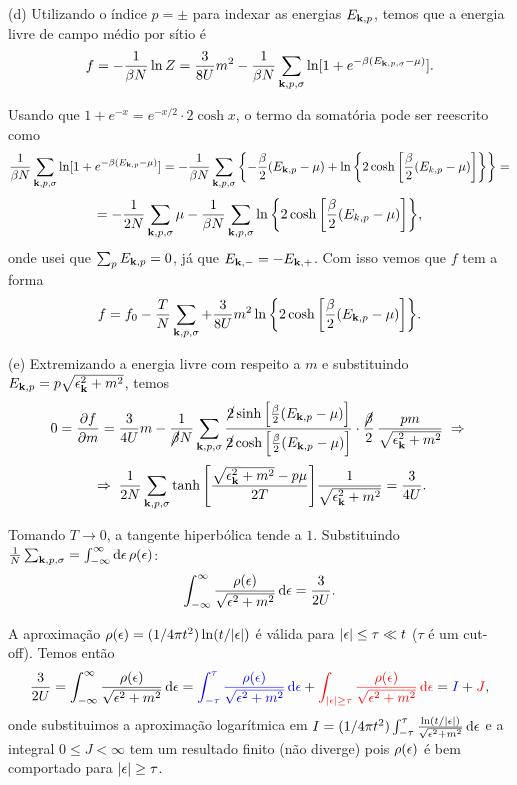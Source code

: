\documentclass[a4paper,10pt]{article}
\begin{document}
\pagebreak

(d) Utilizando o índice $p = \pm$ para indexar as energias $E_{\vb{k},p}$, temos que a energia livre de campo médio por sítio é
$$
f = - \frac{1}{\beta N} \ln Z = \frac{3}{8U}m^2 -
\frac{1}{\beta N} \sum_{\vb{k}, p, \sigma} \ln[ 1 + e^{-\beta (E_{\vb{k},p,\sigma} - \mu)} ].
$$

Usando que $1 + e^{-x} = e^{-x/2} \cdot 2 \cosh x$, o termo da somatória pode ser reescrito como
$$
\frac{1}{\beta N} \sum_{\vb{k}, p, \sigma} \ln[ 1 + e^{-\beta (E_{\vb{k},p} - \mu)} ] =
-\frac{1}{\beta N} \sum_{\vb{k}, p, \sigma} \qty{
-\frac{\beta}{2} (E_{\vb{k},p} - \mu) +
\ln\qty{2 \cosh\qty[\frac{\beta}{2} (E_{k,p} - \mu)] }
} =
$$
$$
=
-\frac{1}{2 N} \sum_{\vb{k}, p, \sigma} \mu -
\frac{1}{\beta N} \sum_{\vb{k}, p, \sigma}
\ln\qty{2 \cosh\qty[\frac{\beta}{2} (E_{k,p} - \mu)] },
$$
onde usei que $\sum_{p} E_{\vb{k},p} = 0$, já que $E_{\vb{k},-} = - E_{\vb{k},+}$. Com isso vemos que $f$ tem a forma
$$
f = f_0 -
\frac{T}{N} \sum_{\vb{k},p,\sigma}
+ \frac{3}{8U} m^2
\ln\qty{2\cosh\qty[\frac{\beta}{2}(E_{\vb{k},p} - \mu)]} .
$$

(e) Extremizando a energia livre com respeito a $m$ e substituindo $E_{\vb{k},p} = p \sqrt{\epsilon_{\vb{k}}^2 + m^2}$, temos
$$
0 = \pdv{f}{m} =
\frac{3}{4U} m -
\frac{1}{\cancel{\beta} N} \sum_{\vb{k}, p, \sigma}
\frac{\cancel{2}\sinh\qty[\frac{\beta}{2}(E_{\vb{k},p}-\mu)]}{\cancel{2}\cosh\qty[\frac{\beta}{2}(E_{\vb{k},p}-\mu)]} \cdot
\frac{\cancel{\beta}}{2} \, \frac{p m}{\sqrt{\epsilon_{\vb{k}}^2 + m^2}} \; \Rightarrow \;
$$
$$
\; \Rightarrow \; \frac{1}{2N} \sum_{\vb{k}, p, \sigma}
\tanh\qty[\frac{\sqrt{\epsilon_{\vb{k}}^2 + m^2} - p\mu}{2T}]
\frac{1}{\sqrt{\epsilon_{\vb{k}}^2 + m^2}} = \frac{3}{4U} .
$$

Tomando $T \to 0$, a tangente hiperbólica tende a $1$. Substituindo $\frac{1}{N} \sum_{\vb{k},p,\sigma} = \int_{-\infty}^{\infty} \dd{\epsilon} \rho(\epsilon)$:
$$
\int_{-\infty}^{\infty} \frac{\rho(\epsilon)}{\sqrt{\epsilon^2 + m^2}} \dd{\epsilon} = \frac{3}{2U}.
$$

A aproximação $\rho(\epsilon) = (1/4\pi t^2) \ln(t/\abs{\epsilon})$ é válida para $\abs{\epsilon} \leq \tau \ll t$ ($\tau$ é um cut-off). Temos então
$$
\frac{3}{2U} = \int_{-\infty}^{\infty} \frac{\rho(\epsilon)}{\sqrt{\epsilon^2 + m^2}} \dd{\epsilon} =
\textcolor{blue}{\int_{-\tau}^{\tau} \frac{\rho(\epsilon)}{\sqrt{\epsilon^2 + m^2}} \dd{\epsilon}} +
\textcolor{red}{\int_{\abs{\epsilon} \geq \tau} \frac{\rho(\epsilon)}{\sqrt{\epsilon^2 + m^2}} \dd{\epsilon}} =
\textcolor{blue}{I} + \textcolor{red}{J},
$$
onde substituimos a aproximação logarítmica em $I = (1/4\pi t^2) \int_{-\tau}^{\tau} \frac{\ln(t/\abs{\epsilon})}{\sqrt{\epsilon^2 + m^2}} \dd{\epsilon}$ e a integral $0 \leq J < \infty$ tem um resultado finito (não diverge) pois $\rho(\epsilon)$ é bem comportado para $\abs{\epsilon} \geq \tau$.
\end{document}
